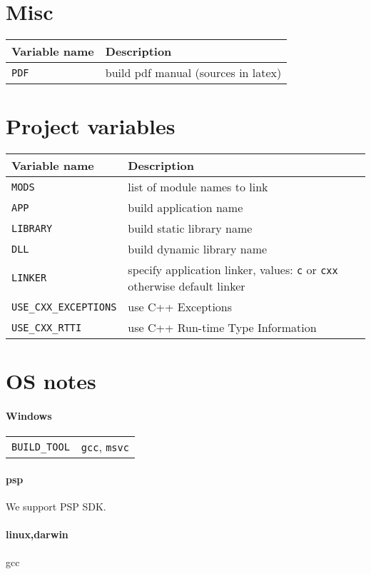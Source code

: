 \documentclass{article}
\newcommand{\var}[1]{{\tt #1}}
\newcommand{\val}[1]{{\tt #1}}
\begin{document}
\section{Misc}

\begin{tabular}{ll}
Variable name		& Description		\\
\hline
\var{PDF}		& build pdf manual (sources in latex) \\
\end{tabular}

\section{Project variables}

\begin{tabular}{ll}
Variable name            & Description                       \\
\hline
\var{MODS}               & list of module names to link      \\
\var{APP}                & build application name            \\
\var{LIBRARY}            & build static library name         \\
\var{DLL}                & build dynamic library name        \\
\var{LINKER}             & specify application linker, values: \val{c} or \val{cxx} otherwise default linker\\
\var{USE\_CXX\_EXCEPTIONS} & use C++ Exceptions                \\
\var{USE\_CXX\_RTTI}       & use C++ Run-time Type Information \\
\end{tabular}

\section{OS notes}

\paragraph{Windows}
\begin{tabular}{ll}
\var{BUILD\_TOOL} & \val{gcc}, \val{msvc} \\
\end{tabular}

\paragraph{psp}
We support PSP SDK.

\paragraph{linux,darwin}
gcc
\end{document}
